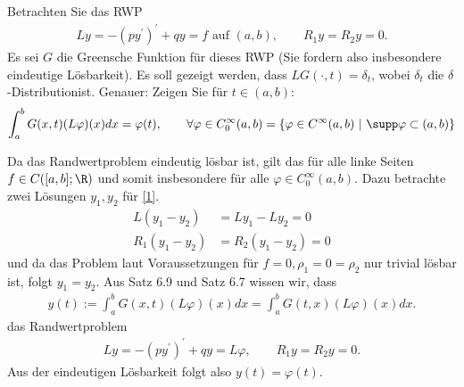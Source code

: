 \begin{exercise}
Betrachten Sie das RWP
\begin{align}\label{1}
  Ly = -(py^{\prime})^{\prime} + qy = f \text{ auf } (a,b), \qquad R_1y = R_2y = 0.
\end{align}
Es sei $G$ die Greensche Funktion für dieses RWP (Sie fordern also insbesondere
eindeutige Lösbarkeit). Es soll gezeigt werden, dass $LG(\cdot,t) = \delta_t$,
wobei $\delta_t$ die \glqq$\delta$-Distribution\grqq ist. Genauer: Zeigen Sie für
$t \in (a,b):$
\begin{align*}
  \int_a^b G(x,t)(L\varphi)(x) dx = \varphi(t), \qquad
  \forall \varphi \in C_0^{\infty}(a,b) = \{\varphi \in C^{\infty}(a,b) ~|~ \supp \varphi \subset (a,b)\}
\end{align*}
\end{exercise}
\begin{solution}
Da das Randwertproblem eindeutig lösbar ist, gilt das für alle linke Seiten $f \in C([a,b];\R)$
und somit insbesondere für alle $\varphi \in C_0^{\infty}(a,b)$.
Dazu betrachte zwei Lösungen $y_1,y_2$ für \eqref{1}.
\begin{align*}
  L(y_1 - y_2) &= Ly_1 - Ly_2 = 0 \\
  R_1(y_1 - y_2) &= R_2(y_1 - y_2) = 0
\end{align*} und da das Problem laut Voraussetzungen für $f = 0, \rho_1 = 0 = \rho_2$
nur trivial lösbar ist, folgt $y_1 = y_2$.
Aus Satz 6.9 und Satz 6.7 wissen wir, dass
\begin{align*}
  y(t) := \int_a^b G(x,t)(L\varphi)(x) dx = \int_a^b G(t,x)(L\varphi)(x) dx.
\end{align*}
das Randwertproblem
\begin{align*}
  Ly = -(py^{\prime})^{\prime} + qy = L\varphi, \qquad R_1y = R_2y = 0.
\end{align*}
Aus der eindeutigen Lösbarkeit folgt also $y(t) = \varphi(t)$.
\end{solution}
